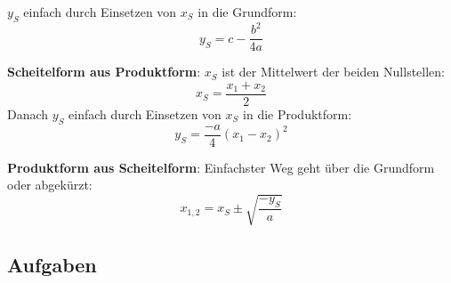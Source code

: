 $y_S$ einfach durch Einsetzen von $x_S$ in die Grundform:
$$y_S=c-\frac{b^2}{4a}$$
 
\textbf{Scheitelform aus Produktform}: $x_S$ ist der Mittelwert der beiden
Nullstellen:
$$x_S=\frac{x_1+x_2}{2}$$
Danach $y_S$ einfach durch Einsetzen von $x_S$ in die Produktform:
$$y_S=\frac{-a}{4}(x_1-x_2)^2$$

\textbf{Produktform aus Scheitelform}: Einfachster Weg geht über die Grundform oder abgekürzt:
$$x_{1,2} =x_S \pm \sqrt{\frac{-y_S}{a}}$$


\subsection{Aufgaben}

